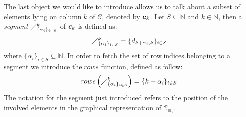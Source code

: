 The last object we would like to introduce allows us 
to talk about a subset of elements lying on column $k$ of $\mathcal{C}$, denoted by $\boldsymbol{c}_{k}$. 
Let $S\subseteq\mathbb{N}$ and $k\in\mathbb{N}$, then a \emph{segment} $\diagup_{\lbrace\alpha_{i}\rbrace_{i\in S}}^{k}$ 
of $\boldsymbol{c}_{k}$ is defined as:
\begin{equation}
    \diagup_{\lbrace\alpha_{i}\rbrace_{i\in S}}^{k}
        = \lbrace d_{k+\alpha_{i},k}\rbrace_{i\in S}
    \label{eq:column:segment}
\end{equation}
where $\lbrace\alpha_{i}\rbrace_{i\in S}\subseteq\mathbb{N}$. In order to fetch the set of 
row indices belonging to a segment we introduce the $rows$ function, defined as follow:
\begin{displaymath}
    rows\left(\diagup_{\lbrace\alpha_{i}\rbrace_{i\in S}}^{k}\right)
        = \lbrace k+\alpha_{i}\rbrace_{i\in S}
    \label{eq:column:segment:rows:function}
\end{displaymath}
The notation for the segment just introduced refers to the position of 
the involved elements in the graphical representation of $\mathcal{C}_{\equiv_{2}}$.

